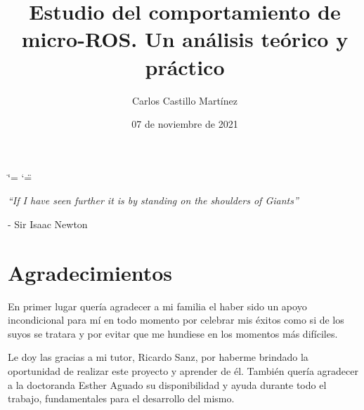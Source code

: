 \documentclass[a4paper,11pt,spanish]{sphinxmanual}
\title{Estudio del comportamiento de micro-ROS. Un análisis teórico y práctico}
\date{07 de noviembre de 2021}
\author{Carlos Castillo Martínez}
\newcommand\blankpage{%
    \null
    \thispagestyle{empty}%
    \newpage}
\begin{document}
\ifdefined\shorthandoff
  \ifnum\catcode`\=\string=\active\shorthandoff{=}\fi
  \ifnum\catcode`\"=\active{}\fi
\fi

\pagestyle{empty}

\newpage
\thispagestyle{empty}


\newpage
\thispagestyle{empty}


\begin{flushright} %
\vspace*{5cm} %

\textit{“If I have seen further it is by standing on the shoulders of Giants”} 

\medskip %
- Sir Isaac Newton

\end{flushright}

\afterpage{\blankpage} %

\newpage
\thispagestyle{empty}

\section*{Agradecimientos} %

En primer lugar quería agradecer a mi familia el haber sido un apoyo incondicional para mí en todo momento por celebrar mis éxitos como si de los suyos se tratara y por evitar que me hundiese en los momentos más difíciles.

Le doy las gracias a mi tutor, Ricardo Sanz, por haberme brindado la oportunidad de realizar este proyecto y aprender de él. También quería agradecer a la doctoranda Esther Aguado su disponibilidad y ayuda durante todo el trabajo, fundamentales para el desarrollo del mismo. 
\end{document}
